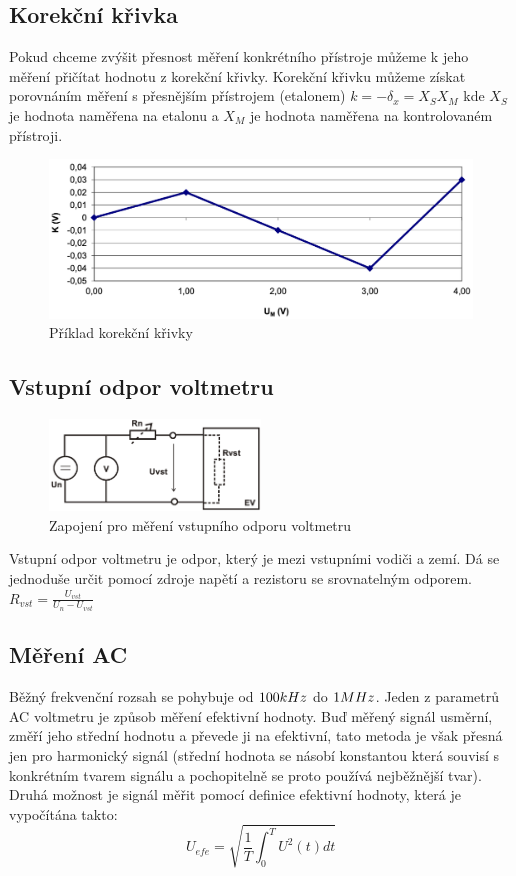 \documentclass{article}
\begin{document}
\subsection*{Korekční křivka}
Pokud chceme zvýšit přesnost měření konkrétního přístroje můžeme k jeho měření přičítat hodnotu z korekční křivky.
Korekční křivku můžeme získat porovnáním měření s přesnějším přístrojem (etalonem) \(k = -\delta_x = X_S X_M\) kde \(X_S\) je hodnota naměřena na etalonu a \(X_M\) je hodnota naměřena na kontrolovaném přístroji.
\begin{figure}[H]
    \includegraphics[width=\textwidth]{obrazky/korekcni_krivka.png}
    \caption{\label{korek_krivka}Příklad korekční křivky}
\end{figure}

\subsection*{Vstupní odpor voltmetru}
\begin{figure}
    \vspace{-10mm}
    \includegraphics[width=0.5\textwidth]{obrazky/vstup_odpor.png}
    \caption{\label{vstupni_odpor}Zapojení pro měření vstupního odporu voltmetru}
\end{figure}
Vstupní odpor voltmetru je odpor, který je mezi vstupními vodiči a zemí.
Dá se jednoduše určit pomocí zdroje napětí a rezistoru se srovnatelným odporem.
\(R_{vst}=\frac{U_{vst}}{U_{n}-U_{vst}}\)

\subsection{Měření AC}
Běžný frekvenční rozsah se pohybuje od \(100\-kHz\) do \(1\-MHz\).
Jeden z parametrů AC voltmetru je způsob měření efektivní hodnoty.
Buď měřený signál usměrní, změří jeho střední hodnotu a převede ji na efektivní, tato metoda je však přesná jen pro harmonický signál (střední hodnota se násobí konstantou která souvisí s konkrétním tvarem signálu a pochopitelně se proto používá nejběžnější tvar).
Druhá možnost je signál měřit pomocí definice efektivní hodnoty, která je vypočítána takto:
\begin{equation}
    U_{efe} = \sqrt{\frac{1}{T}\int_{0}^{T}U^2(t)dt}
    \label{proud_kolektoru}
\end{equation}
\end{document}
